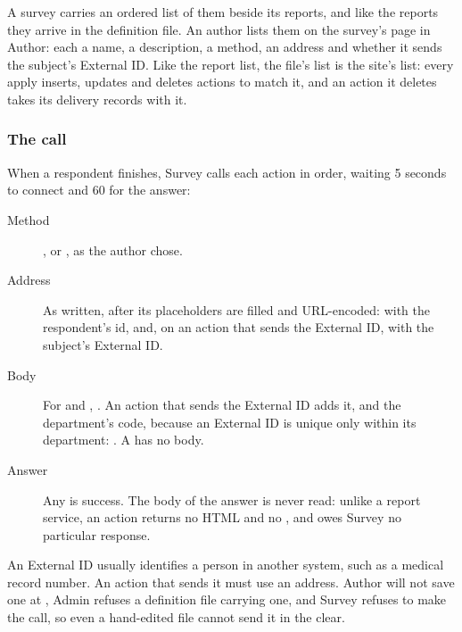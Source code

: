 \documentclass[11pt, a4paper]{article}
\begin{document}
A survey carries an ordered list of them beside its reports, and like the reports they arrive
in the definition file. An author lists them on the survey's  page
in Author: each a name, a description, a method, an address and whether it sends the subject's
External ID. Like the report list, the file's list is the site's list: every apply inserts,
updates and deletes actions to match it, and an action it deletes takes its delivery records with
it.

\subsubsection*{The call}

When a respondent finishes, Survey calls each action in order, waiting 5 seconds to connect and
60 for the answer:

\begin{description}
  \item[Method] ,  or , as the author chose.
  \item[Address] As written, after its placeholders are filled and URL-encoded:
         with the respondent's id, and, on an action that sends the
        External ID,  with the subject's External ID.
  \item[Body] For  and , . An action
        that sends the External ID adds it, and the department's code, because an External ID is
        unique only within its department:
        . A
         has no body.
  \item[Answer] Any  is success. The body of the answer is never read: unlike a report
        service, an action returns no HTML and no , and owes Survey no particular
        response.
\end{description}

\begin{elicitsecurity}
An External ID usually identifies a person in another system, such as a medical record number.
An action that sends it must use an  address. Author will not save one at
, Admin refuses a definition file carrying one, and Survey refuses to make the call,
so even a hand-edited file cannot send it in the clear.
\end{elicitsecurity}
\end{document}
